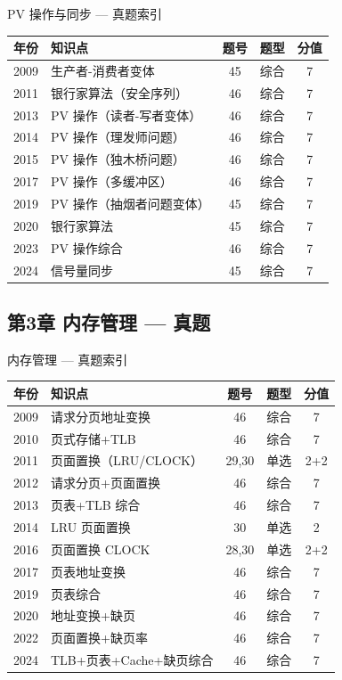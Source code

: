 \begin{tablebox}{PV 操作与同步 — 真题索引}
\centering
\begin{tabular}{|c|l|c|c|c|}
\hline
年份 & 知识点 & 题号 & 题型 & 分值 \\
\hline
2009 & 生产者-消费者变体 & 45 & 综合 & 7 \\
2011 & 银行家算法（安全序列）& 46 & 综合 & 7 \\
2013 & PV 操作（读者-写者变体）& 46 & 综合 & 7 \\
2014 & PV 操作（理发师问题）& 46 & 综合 & 7 \\
2015 & PV 操作（独木桥问题）& 46 & 综合 & 7 \\
2017 & PV 操作（多缓冲区）& 46 & 综合 & 7 \\
2019 & PV 操作（抽烟者问题变体）& 45 & 综合 & 7 \\
2020 & 银行家算法 & 45 & 综合 & 7 \\
2023 & PV 操作综合 & 46 & 综合 & 7 \\
2024 & 信号量同步 & 45 & 综合 & 7 \\
\hline
\end{tabular}
\end{tablebox}

\subsection*{第3章 内存管理 — 真题}

\begin{tablebox}{内存管理 — 真题索引}
\centering
\begin{tabular}{|c|l|c|c|c|}
\hline
年份 & 知识点 & 题号 & 题型 & 分值 \\
\hline
2009 & 请求分页地址变换 & 46 & 综合 & 7 \\
2010 & 页式存储+TLB & 46 & 综合 & 7 \\
2011 & 页面置换（LRU/CLOCK）& 29,30 & 单选 & 2+2 \\
2012 & 请求分页+页面置换 & 46 & 综合 & 7 \\
2013 & 页表+TLB 综合 & 46 & 综合 & 7 \\
2014 & LRU 页面置换 & 30 & 单选 & 2 \\
2016 & 页面置换 CLOCK & 28,30 & 单选 & 2+2 \\
2017 & 页表地址变换 & 46 & 综合 & 7 \\
2019 & 页表综合 & 46 & 综合 & 7 \\
2020 & 地址变换+缺页 & 46 & 综合 & 7 \\
2022 & 页面置换+缺页率 & 46 & 综合 & 7 \\
2024 & TLB+页表+Cache+缺页综合 & 46 & 综合 & 7 \\
\hline
\end{tabular}
\end{tablebox}

